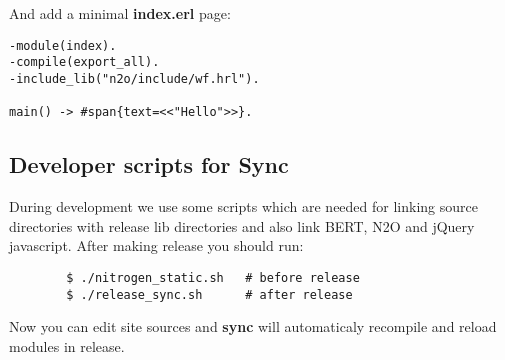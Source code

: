 And add a minimal {\bf index.erl} page:

\vspace{1\baselineskip}
\begin{lstlisting}[caption=index.erl]
-module(index).
-compile(export_all).
-include_lib("n2o/include/wf.hrl").

main() -> #span{text=<<"Hello">>}.
\end{lstlisting}
\vspace{1\baselineskip}

\subsection*{Developer scripts for Sync}
During development we use some scripts which are needed for linking source
directories with release lib directories and also link BERT, N2O and jQuery javascript.
After making release you should run:

\vspace{1\baselineskip}
\begin{lstlisting}
        $ ./nitrogen_static.sh   # before release
        $ ./release_sync.sh      # after release
\end{lstlisting}
\vspace{1\baselineskip}

Now you can edit site sources and {\bf sync} will automaticaly recompile
and reload modules in release.
